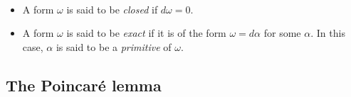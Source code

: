 \documentclass[11pt]{book}
\begin{document}
\begin{terminology} \,
\begin{itemize}
    \item A form $\omega$ is said to be \emph{closed} if $d\omega = 0$.
    \item A form $\omega$ is said to be \emph{exact} if it is of the form $\omega=d\alpha$ for some $\alpha$. In this case, $\alpha$ is said to be a \emph{primitive} of $\omega$.
\end{itemize}
\end{terminology}

\subsection{The Poincar\'e lemma}


\end{document}
